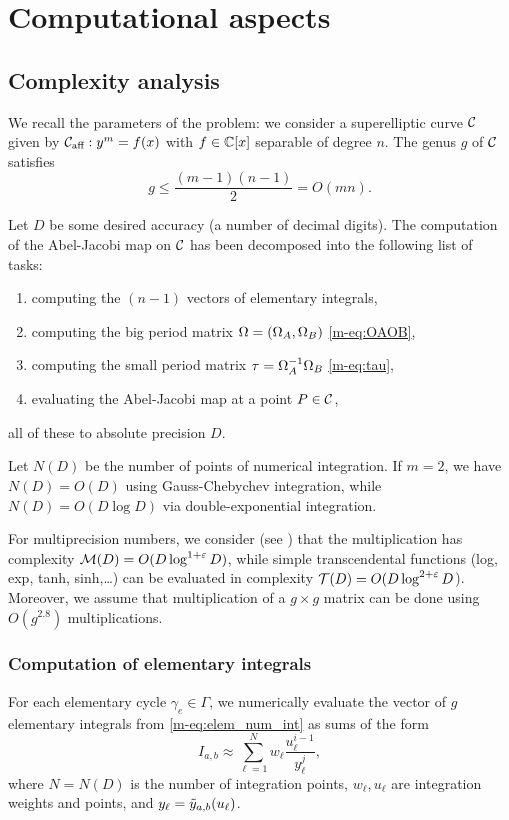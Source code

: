 \documentclass[main.tex]{subfiles}
\begin{document}
  \section{Computational aspects}\label{sec:comp_asp}

   \subsection{Complexity analysis}

   We recall the parameters of the problem: we consider a superelliptic curve $\mathcal{C}$ given by
   $\mathcal{C}_{\text{aff}}:y^m=f(x)$ with $f \in \mathbb{C}[x]$ separable of degree $n$. The genus $g$ of $\mathcal{C}$ satisfies
   $$g \leq \frac{(m-1)(n-1)}2=O(mn).$$

   Let $D$ be some desired accuracy (a number of decimal digits). The computation of
   the Abel-Jacobi map on $\mathcal{C}$ has been decomposed into the
   following list of tasks:
   \begin{enumerate}
       \item computing the $(n-1)$ vectors of elementary integrals,
       \item computing the big period matrix $\Omega=(\Omega_A,\Omega_B)$ \eqref{m-eq:OAOB},
       \item computing the small period matrix $\tau = \Omega_A^{-1}\Omega_B$ \eqref{m-eq:tau},
       \item evaluating the Abel-Jacobi map at a point $P \in \mathcal{C}$,
   \end{enumerate}
   all of these to absolute precision $D$.

   Let $N(D)$ be the number of points of numerical integration.
   If $m=2$, we have
   $N(D)=O(D)$ using Gauss-Chebychev integration, while $N(D)=O(D\log D)$
   via double-exponential integration.

   For multiprecision numbers, we consider (see \cite{BrentZimmermann}) that the multiplication has
   complexity $\mathcal M(D)=O(D \log^{1+\varepsilon}D)$,
   while simple transcendental functions (log, exp, tanh, sinh,\dots) can be evaluated
   in complexity $\mathcal T(D)=O(D\log^{2+\varepsilon} D$).
    Moreover, we assume that multiplication of a $g \times g$ matrix can
    be done using $O(g^{2.8})$ multiplications.

   \subsubsection{Computation of elementary integrals}
   \label{sec:comp_elem}

   For each elementary cycle $\gamma_e\in \Gamma$, we numerically evaluate the vector of $g$
   elementary integrals from \eqref{m-eq:elem_num_int} as sums of the form
   \begin{equation*}
       I_{a,b} \approx \sum_{\ell=1}^N w_\ell\frac{u_\ell^{i-1}}{y_\ell^j},
   \end{equation*}
   where $N = N(D)$ is the number of integration points, $w_\ell,u_\ell$ are integration weights and points,
   and $y_\ell=\tilde{y}_{a,b}(u_\ell)$.
\end{document}
